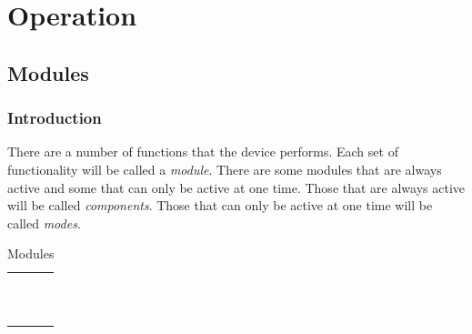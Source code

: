 \part{Operation} \label{Operation}

\chapter{Modules} \label{Modules}

\section{Introduction}

There are a number of functions that the device performs.  Each set of
functionality will be called a \textit{module}.  There are some modules that are
always active and some that can only be active at one time.  Those that are
always active will be called \textit{components}.  Those that can only be active
at one time will be called \textit{modes}.

\begin{table}[H]
\centering
\begin{tabu} { X[1,c,m] | X[1,c,m] }
  \thrule

  & \hyperref[Audio]{} \\
   & \hyperref[Alarm]{} \\
  & \hyperref[Power]{} \\ \mrule

  & \hyperref[Clock]{} \\
  & \hyperref[Set Alarm]{}  \\
  & \hyperref[Timer]{} \\
   & \hyperref[Set Clock]{} \\
  & \hyperref[Power Settings]{} \\
  & \hyperref[Touch Settings]{} \\
  & \hyperref[Set Night Light]{} \\
  \bhrule
\end{tabu}
\caption {Modules}
\end{table}


